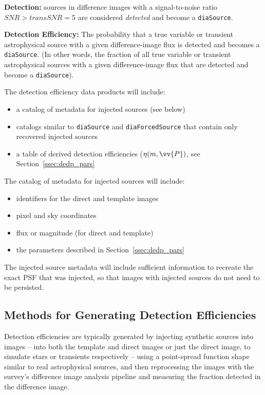 \documentclass[DM,authoryear,toc]{lsstdoc}
\begin{document}
{\bf Detection:} sources in difference images with a signal-to-noise ratio $SNR > {transSNR} = 5$ are considered {\it detected} and become a {\tt diaSource}.
 
{\bf Detection Efficiency:} The probability that a true variable or transient astrophysical source with a given difference-image flux is detected and becomes a {\tt diaSource}.
(In other words, the fraction of all true variable or transient astrophysical sources with a given difference-image flux that are detected and become a {\tt diaSource}).

The detection efficiency data products will include: 

\begin{itemize}
\item a catalog of metadata for injected sources (see below)
\item catalogs similar to {\tt diaSource} and {\tt diaForcedSource} that contain only recovered injected sources
\item a table of derived detection efficiencies ($\eta(m,\vv{P})$, see Section~\ref{ssec:dedp_pars}
\end{itemize}

The catalog of metadata for injected sources will include:

\begin{itemize}
\item identifiers for the direct and template images
\item pixel and sky coordinates
\item flux or magnitude (for direct and template)
\item the parameters described in Section~\ref{ssec:dedp_pars}
\end{itemize}

The injected source metadata will include sufficient information to recreate the exact PSF that was injected, so that images with injected sources do not need to be persisted.


\subsection{Methods for Generating Detection Efficiencies}\label{ssec:dedp_gen}

Detection efficiencies are typically generated by injecting synthetic sources into images -- into both the template and direct images or just the direct image, to simulate stars or transients respectively -- using a point-spread function shape similar to real astrophysical sources, and then reprocessing the images with the survey's difference image analysis pipeline and measuring the fraction detected in the difference image.
\end{document}
